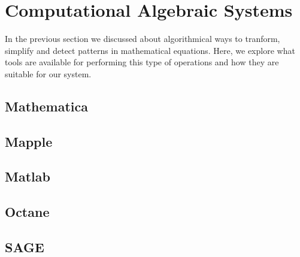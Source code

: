 \section{Computational Algebraic Systems}
In the previous section we discussed about algorithmical ways to tranform, simplify and detect patterns in mathematical equations. Here, we explore what tools are available for performing this type of operations and how they are suitable for our system.

\subsection{Mathematica}
\subsection{Mapple}
\subsection{Matlab}
\subsection{Octane}
\subsection{SAGE}


